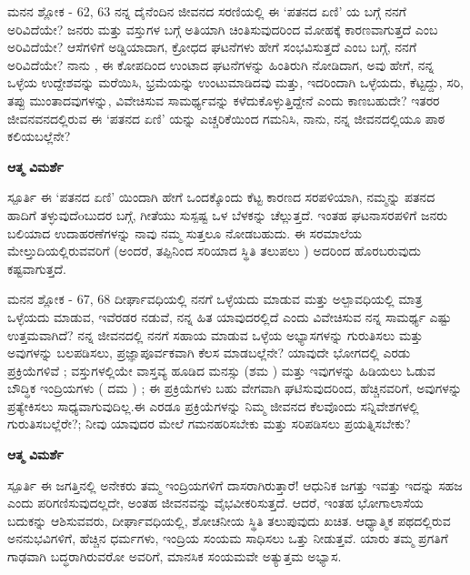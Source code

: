 \newpage
\begin{mananam}{\mananamfont ಮನನ ಶ್ಲೋಕ - \textenglish{62, 63}}
\footnotesize \mananamtext ನನ್ನ ದೈನೆಂದಿನ ಜೀವನದ ಸರಣಿಯಲ್ಲಿ ಈ ‘ಪತನದ ಏಣಿ’ ಯ  ಬಗ್ಗೆ ನನಗೆ ಅರಿವಿದೆಯೇ? ಜನರು ಮತ್ತು ವಸ್ತುಗಳ ಬಗ್ಗೆ ಅತಿಯಾಗಿ ಚಿಂತಿಸುವುದರಿಂದ ಮೋಹಕ್ಕೆ ಕಾರಣವಾಗುತ್ತದೆ ಎಂಬ ಅರಿವಿದೆಯೇ? ಆಸೆಗಳಿಗೆ  ಅಡ್ಡಿಯಾದಾಗ, ಕ್ರೋಧದ ಘಟನೆಗಳು ಹೇಗೆ ಸಂಭವಿಸುತ್ತದೆ ಎಂಬ ಬಗ್ಗೆ, ನನಗೆ ಅರಿವಿದೆಯೇ? ನಾನು , ಈ ಕೋಪದಿಂದ ಉಂಟಾದ ಘಟನೆಗಳನ್ನು ಹಿಂತಿರುಗಿ ನೋಡಿದಾಗ,  ಅವು ಹೇಗೆ, ನನ್ನ ಒಳ್ಳೆಯ ಉದ್ದೇಶವನ್ನು ಮರೆಯಿಸಿ,  ಭ್ರಮೆಯನ್ನು ಉಂಟುಮಾಡಿದವು ಮತ್ತು,  ಇದರಿಂದಾಗಿ ಒಳ್ಳೆಯದು, ಕೆಟ್ಟದ್ದು, ಸರಿ, ತಪ್ಪು ಮುಂತಾದವುಗಳನ್ನು, ವಿವೇಚಿಸುವ ಸಾಮರ್ಥ್ಯವನ್ನು ಕಳೆದುಕೊಳ್ಳುತ್ತಿದ್ದೇನೆ ಎಂದು ಕಾಣಬಹುದೇ?  ಇತರರ ಜೀವನವನದಲ್ಲಿರುವ ಈ ‘ಪತನದ ಏಣಿ’ ಯನ್ನು ಎಚ್ಚರಿಕೆಯಿಂದ ಗಮನಿಸಿ, ನಾನು, ನನ್ನ ಜೀವನದಲ್ಲಿಯೂ ಪಾಠ ಕಲಿಯಬಲ್ಲೆನೇ?
\end{mananam}
\WritingHand\enspace\textbf{ಆತ್ಮ ವಿಮರ್ಶೆ}
\begin{inspiration}{\mananamfont ಸ್ಪೂರ್ತಿ}
\footnotesize \mananamtext ಈ ‘ಪತನದ ಏಣಿ’ ಯಿಂದಾಗಿ ಹೇಗೆ ಒಂದಕ್ಕೊಂದು ಕೆಟ್ಟ ಕಾರಣದ ಸರಪಳಿಯಾಗಿ, ನಮ್ಮನ್ನು ಪತನದ ಹಾದಿಗೆ ತಳ್ಳುವುದೆoಬುದರ ಬಗ್ಗೆ, ಗೀತೆಯು ಸುಸ್ಪಷ್ಟ ಒಳ ಬೆಳಕನ್ನು ಚೆಲ್ಲುತ್ತದೆ. ಇಂತಹ ಘಟನಾಸರಪಳಿಗೆ  ಜನರು ಬಲಿಯಾದ ಉದಾಹರಣೆಗಳನ್ನು ನಾವು ನಮ್ಮ ಸುತ್ತಲೂ ನೋಡಬಹುದು. ಈ ಸರಮಾಲೆಯ ಮೇಲ್ತುದಿಯಲ್ಲಿರುವವರಿಗೆ (ಅಂದರೆ, ತಪ್ಪಿನಿಂದ ಸರಿಯಾದ ಸ್ಥಿತಿ ತಲುಪಲು ) ಅದರಿಂದ ಹೊರಬರುವುದು ಕಷ್ಟವಾಗುತ್ತದೆ. 
\end{inspiration}
\newpage

\begin{mananam}{\mananamfont ಮನನ ಶ್ಲೋಕ - \textenglish{67, 68}}
\footnotesize \mananamtext ದೀರ್ಘಾವಧಿಯಲ್ಲಿ ನನಗೆ ಒಳ್ಳೆಯದು ಮಾಡುವ ಮತ್ತು ಅಲ್ಪಾವಧಿಯಲ್ಲಿ ಮಾತ್ರ ಒಳ್ಳೆಯದು ಮಾಡುವ,  ಇವೆರಡರ ನಡುವೆ, ನನ್ನ ಹಿತ ಯಾವುದರಲ್ಲಿದೆ ಎಂದು ವಿವೇಚಿಸುವ ನನ್ನ ಸಾಮರ್ಥ್ಯ ಎಷ್ಟು ಉತ್ತಮವಾಗಿದೆ? ನನ್ನ ಜೀವನದಲ್ಲಿ ನನಗೆ ಸಹಾಯ ಮಾಡುವ ಒಳ್ಳೆಯ ಅಭ್ಯಾಸಗಳನ್ನು ಗುರುತಿಸಲು ಮತ್ತು ಅವುಗಳನ್ನು ಬಲಪಡಿಸಲು,  ಪ್ರಜ್ಞಾಪೂರ್ವಕವಾಗಿ ಕೆಲಸ ಮಾಡಬಲ್ಲೆನೇ? 
 ಯಾವುದೇ ಭೋಗದಲ್ಲಿ ಎರಡು ಪ್ರಕ್ರಿಯೆಗಳಿವೆ ; ವಸ್ತುಗಳಲ್ಲಿಯೇ ವಾಸ್ತವ್ಯ ಹೂಡಿದ  ಮನಸ್ಸು (ಶಮ ) ಮತ್ತು ಇವುಗಳನ್ನು ಹಿಡಿಯಲು ಓಡುವ  ಬೌದ್ಧಿಕ ಇಂದ್ರಿಯಗಳು ( ದಮ ) ; ಈ ಪ್ರಕ್ರಿಯೆಗಳು ಬಹು ವೇಗವಾಗಿ ಘಟಿಸುವುದರಿಂದ, ಹೆಚ್ಚಿನವರಿಗೆ, ಅವುಗಳನ್ನು ಪ್ರತ್ಯೇಕಿಸಲು ಸಾಧ್ಯವಾಗುವುದಿಲ್ಲ.ಈ ಎರಡೂ ಪ್ರಕ್ರಿಯೆಗಳನ್ನು ನಿಮ್ಮ ಜೀವನದ ಕೆಲವೊಂದು ಸನ್ನಿವೇಶಗಳಲ್ಲಿ ಗುರುತಿಸಬಲ್ಲೆರೇ?; ನೀವು ಯಾವುದರ ಮೇಲೆ ಗಮನಹರಿಸಬೇಕು ಮತ್ತು ಸರಿಪಡಿಸಲು ಪ್ರಯತ್ನಿಸಬೇಕು?
\end{mananam}
\WritingHand\enspace\textbf{ಆತ್ಮ ವಿಮರ್ಶೆ}
\begin{inspiration}{\mananamfont ಸ್ಪೂರ್ತಿ}
\footnotesize \mananamtext ಈ ಜಗತ್ತಿನಲ್ಲಿ ಅನೇಕರು ತಮ್ಮ ಇಂದ್ರಿಯಗಳಿಗೆ ದಾಸರಾಗಿರುತ್ತಾರೆ! ಆಧುನಿಕ ಜಗತ್ತು ಇವತ್ತು ಇದನ್ನು ಸಹಜ ಎಂದು ಪರಿಗಣಿಸುವುದಲ್ಲದೇ, ಅಂತಹ ಜೀವನವನ್ನು ವೈಭವೀಕರಿಸುತ್ತದೆ. ಆದರೆ, ಇಂತಹ ಭೋಗಾಲಾಸೆಯ ಬದುಕನ್ನು ಆಶಿಸುವವರು, ದೀರ್ಘಾವಧಿಯಲ್ಲಿ, ಶೋಚನೀಯ ಸ್ಥಿತಿ ತಲುಪುವುದು ಖಚಿತ. ಆಧ್ಯಾತ್ಮಿಕ ಪಥದಲ್ಲಿರುವ ಅನನುಭವಿಗಳಿಗೆ, ಹೆಚ್ಚಿನ ಧರ್ಮಗಳು, ಇಂದ್ರಿಯ ಸಂಯಮ ಸಾಧಿಸಲು ಒತ್ತು ನೀಡುತ್ತವೆ. ಯಾರು ತಮ್ಮ ಪ್ರಗತಿಗೆ ಗಾಢವಾಗಿ ಬದ್ಧರಾಗಿರುವರೋ ಅವರಿಗೆ, ಮಾನಸಿಕ ಸಂಯಮವೇ ಅತ್ಯುತ್ತಮ ಅಭ್ಯಾಸ.
\end{inspiration}
\newpage

